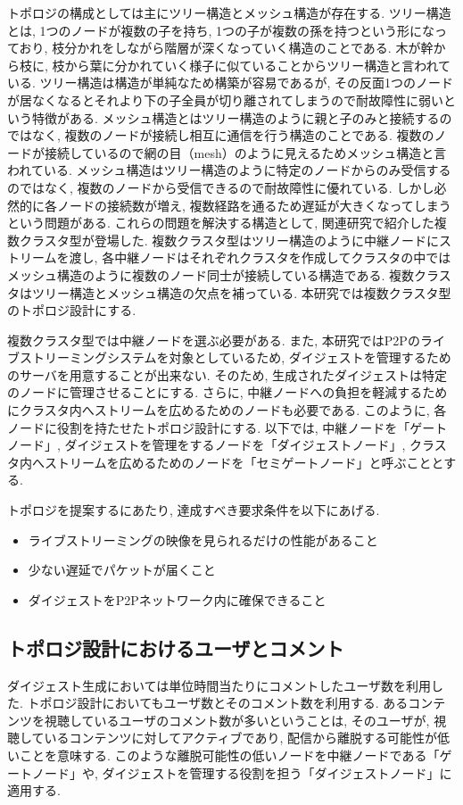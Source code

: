トポロジの構成としては主にツリー構造とメッシュ構造が存在する. ツリー構造とは, 1つのノードが複数の子を持ち, 1つの子が複数の孫を持つという形になっており, 枝分かれをしながら階層が深くなっていく構造のことである. 木が幹から枝に, 枝から葉に分かれていく様子に似ていることからツリー構造と言われている. ツリー構造は構造が単純なため構築が容易であるが, その反面1つのノードが居なくなるとそれより下の子全員が切り離されてしまうので耐故障性に弱いという特徴がある. メッシュ構造とはツリー構造のように親と子のみと接続するのではなく, 複数のノードが接続し相互に通信を行う構造のことである. 複数のノードが接続しているので網の目（mesh）のように見えるためメッシュ構造と言われている. メッシュ構造はツリー構造のように特定のノードからのみ受信するのではなく, 複数のノードから受信できるので耐故障性に優れている. しかし必然的に各ノードの接続数が増え, 複数経路を通るため遅延が大きくなってしまうという問題がある. これらの問題を解決する構造として, 関連研究で紹介した複数クラスタ型が登場した. 複数クラスタ型はツリー構造のように中継ノードにストリームを渡し, 各中継ノードはそれぞれクラスタを作成してクラスタの中ではメッシュ構造のように複数のノード同士が接続している構造である. 複数クラスタはツリー構造とメッシュ構造の欠点を補っている. 本研究では複数クラスタ型のトポロジ設計にする.

複数クラスタ型では中継ノードを選ぶ必要がある. また, 本研究ではP2Pのライブストリーミングシステムを対象としているため, ダイジェストを管理するためのサーバを用意することが出来ない. そのため, 生成されたダイジェストは特定のノードに管理させることにする. さらに, 中継ノードへの負担を軽減するためにクラスタ内へストリームを広めるためのノードも必要である. このように, 各ノードに役割を持たせたトポロジ設計にする. 以下では, 中継ノードを「ゲートノード」, ダイジェストを管理をするノードを「ダイジェストノード」, クラスタ内へストリームを広めるためのノードを「セミゲートノード」と呼ぶこととする.

トポロジを提案するにあたり, 達成すべき要求条件を以下にあげる.

\begin{itemize}
\item ライブストリーミングの映像を見られるだけの性能があること
\item 少ない遅延でパケットが届くこと
\item ダイジェストをP2Pネットワーク内に確保できること
\end{itemize}

\subsection{トポロジ設計におけるユーザとコメント}
ダイジェスト生成においては単位時間当たりにコメントしたユーザ数を利用した. トポロジ設計においてもユーザ数とそのコメント数を利用する. あるコンテンツを視聴しているユーザのコメント数が多いということは, そのユーザが, 視聴しているコンテンツに対してアクティブであり, 配信から離脱する可能性が低いことを意味する. このような離脱可能性の低いノードを中継ノードである「ゲートノード」や, ダイジェストを管理する役割を担う「ダイジェストノード」に適用する.

